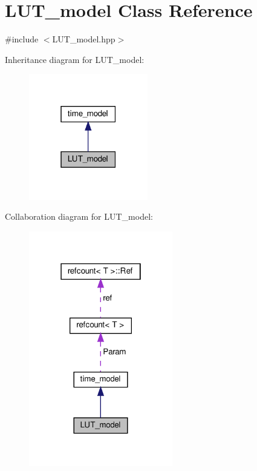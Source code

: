 \hypertarget{classLUT__model}{}\section{L\+U\+T\+\_\+model Class Reference}
\label{classLUT__model}


{\ttfamily \#include $<$L\+U\+T\+\_\+model.\+hpp$>$}



Inheritance diagram for L\+U\+T\+\_\+model\+:
\nopagebreak
\begin{figure}[H]
\begin{center}
\leavevmode
\includegraphics[width=147pt]{da/d4a/classLUT__model__inherit__graph}
\end{center}
\end{figure}


Collaboration diagram for L\+U\+T\+\_\+model\+:
\nopagebreak
\begin{figure}[H]
\begin{center}
\leavevmode
\includegraphics[width=178pt]{dd/dca/classLUT__model__coll__graph}
\end{center}
\end{figure}
